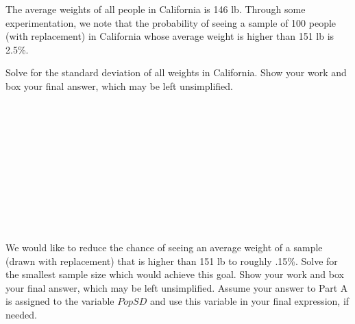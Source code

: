 
The average weights of all people in California is 146 lb. Through some experimentation, we note that the probability of seeing a sample of 100 people (with replacement) in California whose average weight is higher than 151 lb is 2.5\%. 
\begin{enumerate}
 Solve for the standard deviation of all weights in California. Show your work and box your final answer, which may be left unsimplified. \\ \\ \\ \\ \\ \\ \\ \\ \\ \\ \\ \\
 We would like to reduce the chance of seeing an average weight of a sample (drawn with replacement) that is higher than 151 lb to roughly .15\%. Solve for the smallest sample size which would achieve this goal. Show your work and box your final answer, which may be left unsimplified. Assume your answer to Part A is assigned to the variable $PopSD$ and use this variable in your final expression, if needed. \\ \\ \\ \\ \\ \\ \\
\newpage
\end{enumerate}



